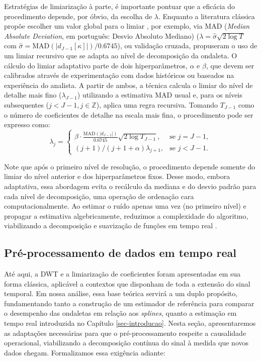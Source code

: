 Estratégias de limiarização à parte, é importante pontuar que a eficácia do procedimento depende, por óbvio, da escolha de \(\lambda\). Enquanto a literatura clássica propõe escolher um valor global para o limiar \cite{morettin_wavelets_2017}, por exemplo, via MAD (\emph{Median Absolute Deviation}, em português: Desvio Absoluto Mediano) (\(\lambda = \hat{\sigma}\sqrt{2\log T}\) com \(\hat{\sigma} = \mathrm{MAD}(|d_{J-1}[\kappa]|)/0.6745\)), ou validação cruzada,  propuseram o uso de um limiar recursivo que se adapta ao nível de decomposição da ondaleta. O cálculo do limiar adaptativo parte de dois hiperparâmetros, \(\alpha\) e \(\beta\), que devem ser calibrados através de experimentação com dados históricos ou baseados na experiência do analista. A partir de ambos, a técnica calcula o limiar do nível de detalhe mais fino (\(\lambda_{J-1}\)) utilizando a estimativa MAD usual e, para os níveis subsequentes (\(j < J - 1, j \in \mathbb{Z}\)), aplica uma regra recursiva. Tomando \(T_{J-1}\) como o número de coeficientes de detalhe na escala mais fina, o procedimento pode ser expresso como:
\begin{equation}
    \lambda_j = 
    \begin{cases} 
        \beta \cdot \frac{\mathrm{MAD}(|d_{J-1}|)}{0.6745}\sqrt{2 \log T_{J-1}}, & \text{se } j = J - 1, \\
        (j + 1)/(j + 1 + \alpha)\lambda_{j+1}, & \text{se } j < J - 1.
    \end{cases}
    \label{eq:recursive_threshold}
\end{equation}

Note que após o primeiro nível de resolução, o procedimento depende somente do limiar do nível anterior e dos hiperparâmetros fixos. Desse modo, embora adaptativa, essa abordagem evita o recálculo da mediana e do desvio padrão para cada nível de decomposição, uma operação de ordenação cara computacionalmente. Ao estimar o ruído apenas uma vez (no primeiro nível) e propagar a estimativa algebricamente, reduzimos a complexidade do algoritmo, viabilizando a decomposição e suavização de funções em tempo real \cite{liu_improved_2014}. 

\subsection{Pré-processamento de dados em tempo real}\label{sec-processamento-tempo-real}
Até aqui, a DWT e a limiarização de coeficientes foram apresentadas em sua forma clássica, aplicável a contextos que disponham de toda a extensão do sinal temporal.
Em nossa análise, essa base teórica servirá a um duplo propósito, fundamentando tanto a construção de um estimador de referência para comparar o desempenho das ondaletas em relação aos \emph{splines}, quanto a estimação em tempo real introduzida no Capítulo \ref{sec-introducao}.
Nesta seção, apresentaremos as adaptações necessárias para que o pré-processamento respeite a causalidade operacional, viabilizando a decomposição contínua do sinal à medida que novos dados chegam.
Formalizamos essa exigência adiante:

